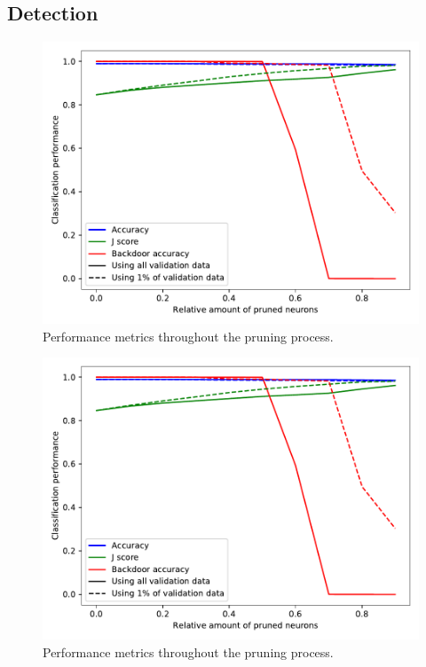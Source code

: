 \documentclass[10pt,sigconf,letterpaper,dvipsnames]{acmart}
\begin{document}
\subsection{Detection}


\begin{figure}[t]
\includegraphics[width=\columnwidth]{../prune_CAIA_backdoor_15/prune.pdf}
\caption{Performance metrics throughout the pruning process.}
\end{figure}

\begin{figure}[t]
\includegraphics[width=\columnwidth]{../prune_CAIA_backdoor_15/prune.pdf}
\caption{Performance metrics throughout the pruning process.}
\end{figure}
\end{document}
